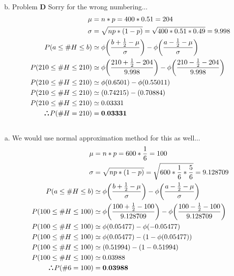\documentclass[10pt]{report}
\def\therefore{\boldsymbol{\text{ }
\leavevmode
\lower0.4ex\hbox{$\cdot$}
\kern-.5em\raise0.7ex\hbox{$\cdot$}
\kern-0.6em\lower0.4ex\hbox{$\cdot$}
\thinspace\text{ }}}
\begin{document}
\begin{enumerate}[(a)]
\begin{align*}
\end{align*}
\item Problem \textbf{D} Sorry for the wrong numbering...
\begin{align*}
\mu &= n*p = 400*0.51 = 204\\
\sigma &= \sqrt{np*(1-p)} = \sqrt{400*0.51*0.49} = 9.998\\
P(a \leq \#H \leq b) &\simeq \phi \bigg(\frac{b+\frac{1}{2} - \mu}{\sigma}\bigg) - \phi \bigg(\frac{a-\frac{1}{2} - \mu}{\sigma}\bigg) \\
P(210 \leq \#H \leq 210) &\simeq \phi \bigg(\frac{210+\frac{1}{2} - 204}{9.998}\bigg) - \phi \bigg(\frac{210-\frac{1}{2} - 204}{9.998}\bigg) \\
P(210 \leq \#H \leq 210) &\simeq \phi (0.6501) - \phi(0.55011) \\
P(210 \leq \#H \leq 210) &\simeq (0.74215) - (0.70884) \\
P(210 \leq \#H \leq 210) &\simeq 0.03331 \\
\therefore P(\#H = 210) &= \mathbf{0.03331} \\
\end{align*}
 \end{enumerate}
 \setcounter{subsection}{7}
 \subsection{}
 \begin{enumerate}[(a)]
 \item We would use normal approximation method for this as well...
 \begin{align*}
\mu &= n*p = 600*\frac{1}{6} = 100\\
\sigma &= \sqrt{np*(1-p)} = \sqrt{600*\frac{1}{6}*\frac{5}{6}} = 9.128709\\
P(a \leq \#H \leq b) &\simeq \phi \bigg(\frac{b+\frac{1}{2} - \mu}{\sigma}\bigg) - \phi \bigg(\frac{a-\frac{1}{2} - \mu}{\sigma}\bigg) \\
P(100 \leq \#H \leq 100) &\simeq \phi \bigg(\frac{100+\frac{1}{2} - 100}{9.128709}\bigg) - \phi \bigg(\frac{100-\frac{1}{2} - 100}{9.128709}\bigg) \\
P(100 \leq \#H \leq 100) &\simeq \phi (0.05477) - \phi(-0.05477) \\
P(100 \leq \#H \leq 100) &\simeq \phi (0.05477) - (1-\phi(0.05477)) \\
P(100 \leq \#H \leq 100) &\simeq (0.51994) - (1-0.51994) \\
P(100 \leq \#H \leq 100) &\simeq 0.03988 \\
\therefore P(\#6 = 100) &= \mathbf{0.03988} \\
\end{align*}
 \end{enumerate}
\end{document}
